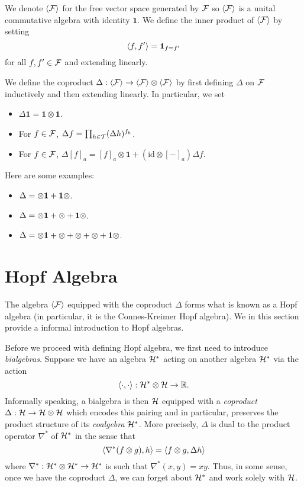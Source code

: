 \documentclass[11pt]{style/preprint}
\begin{document}
We denote \(\< \CF \>\) for the free vector space generated by \({\mathcal F}\) so \(\< \CF\>\) 
is a unital commutative algebra with identity \(\mathbf{1}\). We define the inner product of \(\< \CF \>\)
by setting 
\begin{equation}\label{eq:inner-product}
  \< f, f'\> = \mathbf{1}_{f = f'}
\end{equation}
for all \(f, f' \in {\mathcal F}\) and extending linearly. 

We define the coproduct \(\Delta : \< \CF \> \to \< \CF \> \otimes \< \CF \>\) 
by first defining \(\Delta\) on \({\mathcal F}\) inductively and then extending linearly. In particular, we set
\begin{itemize}
  \item \(\Delta \mathbf{1} = \mathbf{1} \otimes \mathbf{1}\).
  \item For \(f \in {\mathcal F}\), \(\Delta f = \prod_{h \in {\mathcal T}} (\Delta h)^{f_h}\).
  \item For \(f \in {\mathcal F}\), \(\Delta [f]_a = [f]_a \otimes \mathbf{1} + (\text{id} \otimes [-]_a) \Delta f\).
\end{itemize} 
Here are some examples:
\begin{itemize}
  \item \(\Delta \tree<X> = \tree<X> \otimes \mathbf{1} + \mathbf{1} \otimes \tree<X>\).
  \item \(\Delta \tree<1> = \tree<1> \otimes \mathbf{1} + \tree<Xb> \otimes \tree<X> + \mathbf{1} \otimes \tree<1>\).
  \item \(\Delta \tree<2> = \tree<2> \otimes \mathbf{1} + \tree<Xb> \tree<Xc> \otimes \tree<X> + \tree<Xc> \otimes \tree<1> 
    + \tree<Xb> \otimes \tree<1ac> + \mathbf{1} \otimes \tree<2>\).
\end{itemize}

\section{Hopf Algebra}

The algebra \(\< \CF\>\) equipped with the coproduct \(\Delta\) forms what is known as a 
Hopf algebra (in particular, it is the Connes-Kreimer Hopf algebra). We in this section provide a 
informal introduction to Hopf algebras.

Before we proceed with defining Hopf algebra, we first need to introduce \textit{bialgebras}.
Suppose we have an algebra \({\mathcal H}^*\) acting on another algebra \({\mathcal H}^*\) via the action 
\[\< \cdot, \cdot \> : \CH^* \otimes \CH \to \mathbb{R}.\]
Informally speaking, a bialgebra is then \({\mathcal H}\) equipped with a \textit{coproduct} \(\Delta : {\mathcal H} \to {\mathcal H} \otimes {\mathcal H}\) 
which encodes this pairing and in particular, preserves the product structure of its \textit{coalgebra} \({\mathcal H}^*\). More precisely,
\(\Delta\) is dual to the product operator \(\nabla^*\) of \({\mathcal H}^*\) in the sense that 
\[\< \nabla^*(f \otimes g), h\> = \< f \otimes g, \Delta h\>\]
where \(\nabla^* : {\mathcal H}^* \otimes {\mathcal H}^* \to {\mathcal H}^*\) is such that \(\nabla^*(x, y) = xy\). Thus, in some 
sense, once we have the coproduct \(\Delta\), we can forget about \({\mathcal H}^*\) and work solely with \({\mathcal H}\).
\end{document}
